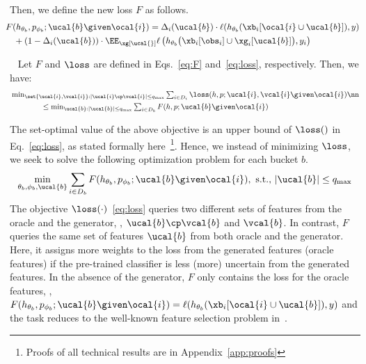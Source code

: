 \documentclass[letterpaper]{article}
\renewcommand{\cite}{\citep}
\begin{document}
Then, we  define the new loss $F$ as follows.
\begin{align}
& \hspace{-2mm}F(h_{\theta_b},p_{\phi_b};\ucal{b} \given \ocal{i})  =
 \Delta_i(\ucal{b})  \cdot \ell(h_{\theta_b}(\xb_i[\ocal{i} \cup \ucal{b}]), y )   \nonumber \\  
& \  + (1-\Delta_i(\ucal{b}) ) \cdot \EE_{\xg[\ucal{}] }   \ell\left(h_{\theta_b}\big(\xb_i [\obs_i ] \cup \xg_i [\ucal{b}]\big), y_i\right)
\label{eq:F}
\end{align}

\begin{proposition}~\label{prop:0}
Let $F$ and $\loss$ are defined in Eqs.~\ref{eq:F} and~\eqref{eq:loss}, respectively. Then, we have:
\begin{align}
&\textstyle\min_{\set{\ucal{i}, \vcal{i}}: |\ucal{i}\cp\vcal{i}| \le q_{\max}} \sum_{i\in D_i}\loss(h,p; \ucal{i}, \vcal{i}\given \ocal{i} ) \nn\\
& \qquad \qquad \le \textstyle \min_{\ucal{b}: |\ucal{b}| \le q_{\max}}\sum_{i\in D_b}F(h,p; \ucal{b} \given \ocal{i} ) 
\end{align}
\vspace{-3mm}
\end{proposition}

The set-optimal value of the above objective is an upper bound of  $\loss ()$  in Eq.~\eqref{eq:loss}, as stated formally here~\footnote{\scriptsize Proofs of all technical results are  in Appendix~\ref{app:proofs}}.
Hence, we instead of minimizing $\loss$, 
 we seek to solve the following optimization problem for each bucket $b$.
\begin{align}
\min_{\theta_b,\phi_b, \ucal{b} } \sum_{i\in D_b}F(h_{\theta_b},p_{\phi_b};\ucal{b} \given \ocal{i}), \ \text{s.t., } |\ucal{b}| \le q_{\max} \label{eq:objxx}
\end{align}
The objective $\loss(\cdot)$~\eqref{eq:loss} queries two different sets of features from the oracle and the generator, \ie, $\ucal{b}\cp\vcal{b}$ and $\vcal{b}$. In contrast, $F$ queries the same set of features $\ucal{b}$ from both oracle and the generator.  Here, it assigns more weights to the loss from the generated features (oracle features) if the pre-trained classifier is less (more) uncertain from the generated features. In the absence of the generator, $F$ only contains the loss for the oracle features, \ie, $F(h_{\theta_b},p_{\phi_b};\ucal{b} \given \ocal{i})= \ell(h_{\theta_b} (\xb_i [\ocal{i} \cup \ucal{b}]),y)$ and the task reduces to the well-known feature selection problem in~\cite{elenberg2018restricted}.
\end{document}
